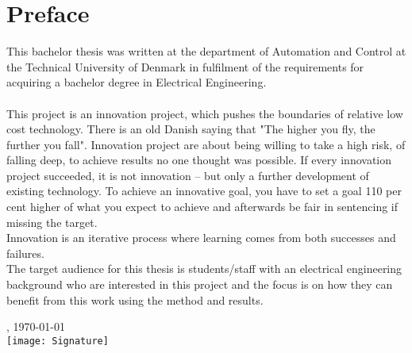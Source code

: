 \chapter{Preface}
This bachelor thesis was written at the department of Automation and Control at the Technical University of Denmark in fulfilment of the requirements for acquiring a bachelor degree in Electrical Engineering.\\
\\
\noindent
This project is an innovation project, which pushes the boundaries of relative low cost technology. There is an old Danish saying that "The higher you fly, the further you fall". Innovation project are about being willing to take a high risk, of falling deep, to achieve results no one thought was possible. If every innovation project succeeded, it is not innovation -- but only a further development of existing technology. To achieve an innovative goal, you have to set a goal 110 per cent higher of what you expect to achieve and afterwards be fair in sentencing if missing the target.\\
Innovation is an iterative process where learning comes from both successes and failures. 
\\
\noindent
The target audience for this thesis is students/staff with an electrical engineering background who are interested in this project and the focus is on how they can benefit from this work using the method and results.    

\vfill

{
\centering
    \thesislocation{}, \today\\[1cm]
    \hspace{3cm}\texttt{[image: Signature]}\\[1cm]
\begin{flushright}
    \thesisauthor{}
\end{flushright}
}